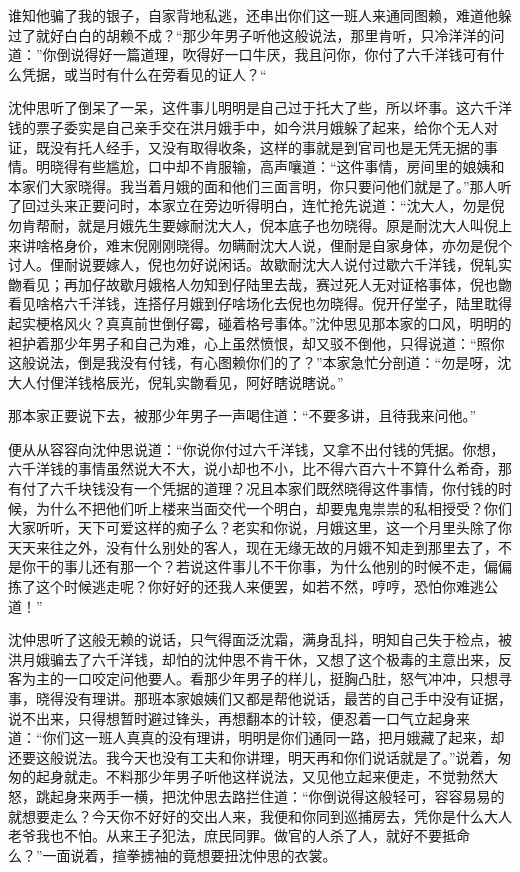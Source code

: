 \documentclass[12pt,UTF8]{ctexbook}
\begin{document}
{{{谁知他骗了我的银子，自家背地私逃，还串出你们这一班人来通同图赖，难道他躲过了就好白白的胡赖不成？“那少年男子听他这般说法，那里肯听，只冷洋洋的问道：”你倒说得好一篇道理，吹得好一口牛厌，我且问你，你付了六千洋钱可有什么凭据，或当时有什么在旁看见的证人？“

沈仲思听了倒呆了一呆，这件事儿明明是自己过于托大了些，所以坏事。这六千洋钱的票子委实是自己亲手交在洪月娥手中，如今洪月娥躲了起来，给你个无人对证，既没有托人经手，又没有取得收条，这样的事就是到官司也是无凭无据的事情。明晓得有些尴尬，口中却不肯服输，高声嚷道：“这件事情，房间里的娘姨和本家们大家晓得。我当着月娥的面和他们三面言明，你只要问他们就是了。”那人听了回过头来正要问时，本家立在旁边听得明白，连忙抢先说道：“沈大人，勿是倪勿肯帮耐，就是月娥先生要嫁耐沈大人，倪本底子也勿晓得。原是耐沈大人叫倪上来讲啥格身价，难末倪刚刚晓得。勿瞒耐沈大人说，俚耐是自家身体，亦勿是倪个讨人。俚耐说要嫁人，倪也勿好说闲话。故歇耐沈大人说付过歇六千洋钱，倪轧实朆看见；再加仔故歇月娥格人勿知到仔陆里去哉，赛过死人无对证格事体，倪也朆看见啥格六千洋钱，连搭仔月娥到仔啥场化去倪也勿晓得。倪开仔堂子，陆里耽得起实梗格风火？真真前世倒仔霉，碰着格号事体。”沈仲思见那本家的口风，明明的袒护着那少年男子和自己为难，心上虽然愤恨，却又驳不倒他，只得说道：“照你这般说法，倒是我没有付钱，有心图赖你们的了？”本家急忙分剖道：“勿是呀，沈大人付俚洋钱格辰光，倪轧实朆看见，阿好瞎说瞎说。”

那本家正要说下去，被那少年男子一声喝住道：“不要多讲，且待我来问他。”

便从从容容向沈仲思说道：“你说你付过六千洋钱，又拿不出付钱的凭据。你想，六千洋钱的事情虽然说大不大，说小却也不小，比不得六百六十不算什么希奇，那有付了六千块钱没有一个凭据的道理？况且本家们既然晓得这件事情，你付钱的时候，为什么不把他们听上楼来当面交代一个明白，却要鬼鬼祟祟的私相授受？你们大家听听，天下可爱这样的痴子么？老实和你说，月娥这里，这一个月里头除了你天天来往之外，没有什么别处的客人，现在无缘无故的月娥不知走到那里去了，不是你干的事儿还有那一个？若说这件事儿不干你事，为什么他别的时候不走，偏偏拣了这个时候逃走呢？你好好的还我人来便罢，如若不然，哼哼，恐怕你难逃公道！”

沈仲思听了这般无赖的说话，只气得面泛沈霜，满身乱抖，明知自己失于检点，被洪月娥骗去了六千洋钱，却怕的沈仲思不肯干休，又想了这个极毒的主意出来，反客为主的一口咬定问他要人。看那少年男子的样儿，挺胸凸肚，怒气冲冲，只想寻事，晓得没有理讲。那班本家娘姨们又都是帮他说话，最苦的自己手中没有证据，说不出来，只得想暂时避过锋头，再想翻本的计较，便忍着一口气立起身来道：“你们这一班人真真的没有理讲，明明是你们通同一路，把月娥藏了起来，却还要这般说法。我今天也没有工夫和你讲理，明天再和你们说话就是了。”说着，匆匆的起身就走。不料那少年男子听他这样说法，又见他立起来便走，不觉勃然大怒，跳起身来两手一横，把沈仲思去路拦住道：“你倒说得这般轻可，容容易易的就想要走么？今天你不好好的交出人来，我便和你同到巡捕房去，凭你是什么大人老爷我也不怕。从来王子犯法，庶民同罪。做官的人杀了人，就好不要抵命么？”一面说着，揎拳掳袖的竟想要扭沈仲思的衣裳。

}}}
\end{document}
